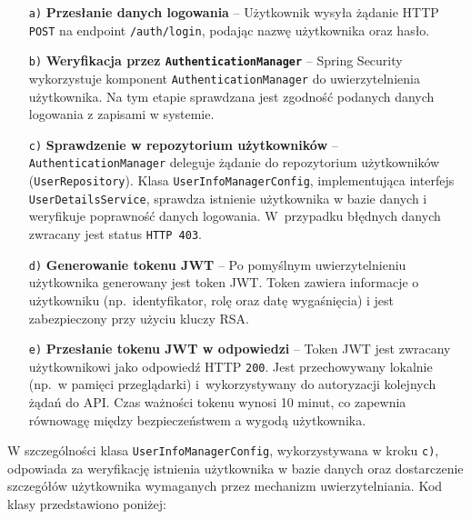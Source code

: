 \begin{enumerate}
    \item[\texttt{a)}] \textbf{Przesłanie danych logowania} -- Użytkownik wysyła żądanie HTTP \texttt{POST} na endpoint \texttt{/auth/login}, podając nazwę użytkownika oraz hasło. 

    \item[\texttt{b)}] \textbf{Weryfikacja przez \texttt{AuthenticationManager}} -- Spring Security wykorzystuje komponent \texttt{AuthenticationManager} do uwierzytelnienia użytkownika. Na tym etapie sprawdzana jest zgodność podanych danych logowania z zapisami w systemie.

    \item[\texttt{c)}] \textbf{Sprawdzenie w repozytorium użytkowników} -- \texttt{AuthenticationManager} deleguje żądanie do repozytorium użytkowników (\texttt{UserRepository}). Klasa \texttt{UserInfoManagerConfig}, implementująca interfejs \texttt{UserDetailsService}, sprawdza istnienie użytkownika w bazie danych i weryfikuje poprawność danych logowania. W~przypadku błędnych danych zwracany jest status \texttt{HTTP 403}.

    \item[\texttt{d)}] \textbf{Generowanie tokenu JWT} -- Po pomyślnym uwierzytelnieniu użytkownika generowany jest token JWT. Token zawiera informacje o użytkowniku (np.\ identyfikator, rolę oraz datę wygaśnięcia) i jest zabezpieczony przy użyciu kluczy RSA.

    \item[\texttt{e)}] \textbf{Przesłanie tokenu JWT w odpowiedzi} -- Token JWT jest zwracany użytkownikowi jako odpowiedź HTTP \texttt{200}. Jest przechowywany lokalnie (np.\ w pamięci przeglądarki) i~wykorzystywany do autoryzacji kolejnych żądań do API. Czas ważności tokenu wynosi 10 minut, co zapewnia równowagę między bezpieczeństwem a wygodą użytkownika.
\end{enumerate}

W szczególności klasa \texttt{UserInfoManagerConfig}, wykorzystywana w kroku \texttt{c)}, odpowiada za weryfikację istnienia użytkownika w bazie danych oraz dostarczenie szczegółów użytkownika wymaganych przez mechanizm uwierzytelniania. Kod klasy przedstawiono poniżej:

